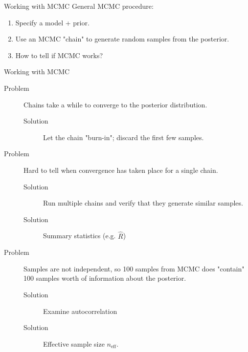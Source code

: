 \documentclass{beamer}
\begin{document}
\begin{frame}{Working with MCMC}
General MCMC procedure:
    \begin{enumerate}
        \item Specify a model + prior.
        \item Use an MCMC "chain" to generate random samples from the posterior.
        \item How to tell if MCMC works?
    \end{enumerate}
\end{frame}

\begin{frame}{Working with MCMC}
    \begin{description}
        \item[Problem] Chains take a while to converge to the posterior distribution.
            \begin{description}
                \item[Solution] Let the chain "burn-in"; discard the first few samples.
            \end{description}
        \item[Problem] Hard to tell when convergence has taken place for a single chain.
            \begin{description}
                \item[Solution] Run multiple chains and verify that they generate similar 
                                samples.
                \item[Solution] Summary statistics (e.g. $\hat{R}$)
            \end{description}
        \item[Problem] Samples are not independent, so 100 samples from MCMC does "contain"
                       100 samples worth of information about the posterior.
            \begin{description}
                \item[Solution] Examine autocorrelation 
                \item[Solution] Effective sample size $n_\text{eff}$.
            \end{description}
    \end{description}
\end{frame}
\end{document}
